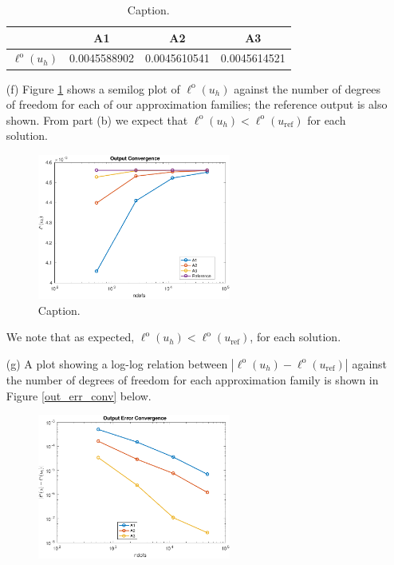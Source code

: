 \documentclass{article}
\begin{document}
\begin{itemize}
			   \begin{table}[H]
			   	\centering
			   	\begin{tabular}{r||c|c|c}
			   		& A1 & A2 & A3 \\
			   		\hline
			   		\(\ell^\text{o}(u_h)\) & 0.0045588902 & 0.0045610541 & 0.0045614521\\
			   	\end{tabular}
			   	\caption{Caption.}
			   	\label{table1}
			   \end{table}
	\item[(f)] Figure \ref{out_conv} shows a semilog plot of \(\ell^\text{o}(u_h) \) against the number of degrees of freedom for each of our approximation families; the reference output is also shown. From part (b) we expect that \(\ell^\text{o}(u_h) < \ell^\text{o}(u_\text{ref})\) for each solution. 
	\begin{figure}[H]
		\centering
		\includegraphics[width=0.6\textwidth]{Plate_output_conv.pdf}
		\caption{Caption.}
		\label{out_conv}
	\end{figure}
	We note that as expected, \(\ell^\text{o}(u_h) < \ell^\text{o}(u_\text{ref})\), for each solution. 
	\item[(g)] A plot showing a log-log relation between \(|\ell^\text{o}(u_h) - \ell^\text{o}(u_\text{ref})| \) against the number of degrees of freedom for each approximation family is shown in Figure \ref{out_err_conv} below. 
	\begin{figure}[H]
		\centering
		\includegraphics[width=0.6\textwidth]{Plate_output_error_conv.pdf}

\end{figure}
\end{itemize}
\end{document}
